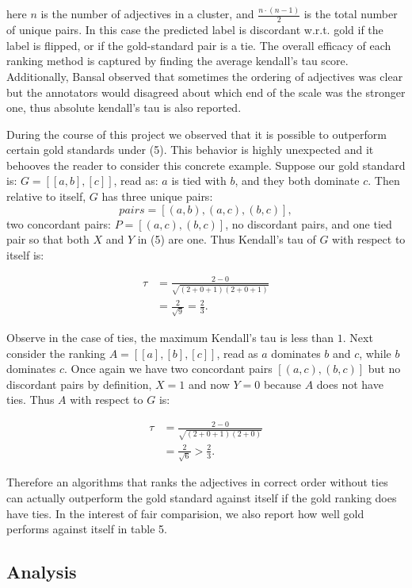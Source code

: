 here $n$ is the number of adjectives in a cluster, and $\frac{n \cdot (n-1)}{2}$ is the total number of unique pairs. In this case the predicted label is discordant w.r.t. gold if the label is flipped, or if the gold-standard pair is a tie. The overall efficacy of each ranking method is captured by finding the average kendall's tau score. Additionally, Bansal observed that sometimes the ordering of adjectives was clear but the annotators would disagreed about which end of the scale was the stronger one, thus absolute kendall's tau is also reported.

During the course of this project we observed that it is possible to outperform certain gold standards under (5). This behavior is highly unexpected and it behooves the reader to consider this concrete example. Suppose our gold standard is: $G = [[a,b],[c]]$, read as: $a$ is tied with $b$, and they both dominate $c$. Then relative to itself, $G$ has three unique pairs:
\[
	pairs = [(a,b),(a,c),(b,c)],
\]
two concordant pairs: $P = [(a,c),(b,c)]$, no discordant pairs, and one tied pair so that both $X$ and $Y$ in (5) are one. Thus Kendall's tau of $G$ with respect to itself is:

\begin{align*}
	\tau &= \frac{2 - 0}{\sqrt{(2 + 0 + 1)(2 + 0 + 1)}} \\
		 &= \frac{2}{\sqrt{9}} = \frac{2}{3}.
\end{align*}

Observe in the case of ties, the maximum Kendall's tau is less than $1$. Next consider the ranking $A = [[a],[b],[c]]$, read as $a$ dominates $b$ and $c$, while $b$ dominates $c$. Once again we have two concordant pairs $[(a,c),(b,c)]$ but no discordant pairs by definition, $X = 1$ and now $Y = 0$ because $A$ does not have ties. Thus $A$ with respect to $G$ is:

\begin{align*}
	\tau &= \frac{2 - 0}{\sqrt{(2 + 0 + 1)(2 + 0)}} \\
		 &= \frac{2}{\sqrt{6}} > \frac{2}{3}.
\end{align*}

Therefore an algorithms that ranks the adjectives in correct order without ties can actually outperform the gold standard against itself if the gold ranking does have ties. In the interest of fair comparision, we also report how well gold performs against itself in table 5.

\subsection{Analysis}


